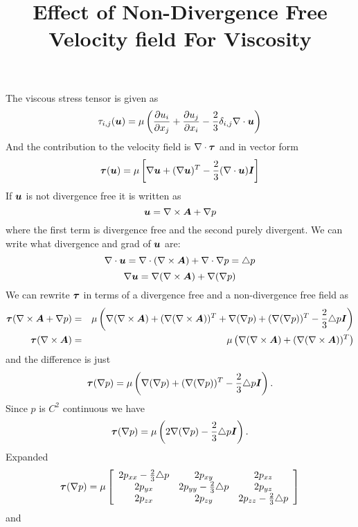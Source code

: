 \documentclass{article}
\title{Effect of Non-Divergence Free Velocity field For Viscosity}
\renewcommand{\vec}[1]{\hbox{\boldmath $#1$}}
\begin{document}
\maketitle


The viscous stress tensor is given as 
$$\tau_{i,j}(\vec{u}) = \mu \left(\frac{\partial u_i}{\partial x_j}  + \frac{\partial u_j}{\partial x_i} - \frac{2}{3}\delta_{i,j} \nabla\cdot\vec{u} \right)$$
And the contribution to the velocity field is $\nabla\cdot\vec{\tau}$ and in vector form
$$\vec{\tau}(\vec{u}) = \mu \left[ \nabla\vec{u}+(\nabla\vec{u})^T - \frac{2}{3} (\nabla\cdot\vec{u}) \vec{I} \right] $$
If $\vec{u}$ is not divergence free it is written as
$$\vec{u}=\nabla\times \vec{A} + \nabla p$$
where the first term is divergence free and the second purely divergent.
We can write what divergence and grad of $\vec{u}$ are:
$$\nabla\cdot\vec{u}=\nabla\cdot(\nabla\times\vec{A})+\nabla\cdot\nabla p = \triangle p$$
$$\nabla\vec{u}=\nabla(\nabla\times\vec{A}) + \nabla(\nabla p)$$
We can rewrite $\vec{\tau}$ in terms of a divergence free and a non-divergence free field as 
\begin{eqnarray}
\vec{\tau}(\nabla\times \vec{A} + \nabla p) &=& \mu \left( \nabla(\nabla\times\vec{A}) + (\nabla(\nabla\times\vec{A}))^T + \nabla(\nabla p) + (\nabla(\nabla p))^T - \frac{2}{3} \triangle p
\vec{I} \right) \\
\vec{\tau}(\nabla\times \vec{A}) &=& \mu \left( \nabla(\nabla\times\vec{A}) + (\nabla(\nabla\times\vec{A}))^T \right) \\
\end{eqnarray}
and the difference is just
$$\vec{\tau}(\nabla p) = \mu \left( \nabla(\nabla p) + (\nabla(\nabla p))^T - \frac{2}{3} \triangle p \vec{I} \right). $$
Since $p$ is $C^2$ continuous we have
$$\vec{\tau}(\nabla p) = \mu \left( 2\nabla(\nabla p) - \frac{2}{3} \triangle p \vec{I} \right). $$
Expanded
$$ \vec{\tau}(\nabla p) = \mu\left[\begin{array}{ccc}
2 p_{xx} - \frac{2}{3} \triangle p & 2 p_{xy} & 2 p_{xz} \\ 
2 p_{yx} & 2 p_{yy}-  \frac{2}{3} \triangle p & 2 p_{yz}\\ 
2 p_{zx} & 2 p_{zy} & 2 p_{zz} - \frac{2}{3} \triangle p\\
         \end{array} \right]
$$
and
\end{document}
